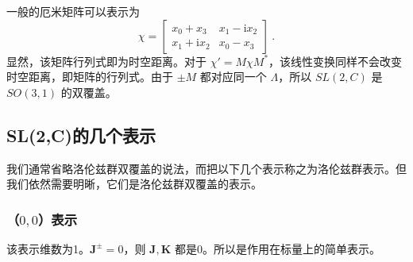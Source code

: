 一般的厄米矩阵可以表示为
\begin{equation}
\chi=\left[\begin{array}{cc}
x_0+x_3 & x_1-\mathrm{i} x_2 \\
x_1+\mathrm{i}x_2 & x_0-x_3
\end{array}\right]~.
\end{equation}
显然，该矩阵行列式即为时空距离。对于 $\chi'=M \chi M^{*}$，该线性变换同样不会改变时空距离，即矩阵的行列式。由于 $\pm M$ 都对应同一个 $\Lambda$，所以 $SL(2,C)$ 是 $SO(3,1)$ 的双覆盖。

\subsection{SL(2,C)的几个表示}
我们通常省略洛伦兹群双覆盖的说法，而把以下几个表示称之为洛伦兹群表示。但我们依然需要明晰，它们是洛伦兹群双覆盖的表示。

\subsubsection{（$0,0$）表示}
该表示维数为1。$\mathbf{J}^{\pm}=0$，则 $\mathbf{J},\mathbf{K}$ 都是0。所以是作用在标量上的简单表示。

